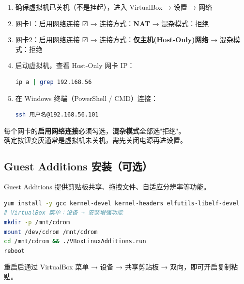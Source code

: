 \documentclass[12pt,a4paper]{ctexart}
\begin{document}
\begin{enumerate}[label=\arabic*.,leftmargin=*]
  \item 确保虚拟机已关机（不是挂起），进入 VirtualBox → 设置 → 网络
  \item 网卡1：启用网络连接 ☑ → 连接方式：\textbf{NAT} → 混杂模式：拒绝
  \item 网卡2：启用网络连接 ☑ → 连接方式：\textbf{仅主机(Host-Only)网络} → 混杂模式：拒绝
  \item 启动虚拟机，查看 Host-Only 网卡 IP：
  \begin{cmdbox}
  \begin{lstlisting}[language=bash,numbers=none]
ip a | grep 192.168.56
  \end{lstlisting}
  \end{cmdbox}
  \item 在 Windows 终端（PowerShell / CMD）连接：
  \begin{cmdbox}
  \begin{lstlisting}[language=bash,numbers=none]
ssh 用户名@192.168.56.101
  \end{lstlisting}
  \end{cmdbox}
\end{enumerate}

\begin{warnbox}
  每个网卡的\textbf{启用网络连接}必须勾选，\textbf{混杂模式}全部选"拒绝"。\\
  确定按钮变灰通常是虚拟机未关机，需先关闭电源再进设置。
\end{warnbox}

\subsection{Guest Additions 安装（可选）}

Guest Additions 提供剪贴板共享、拖拽文件、自适应分辨率等功能。

\begin{cmdbox}
\small
\begin{lstlisting}[language=bash,numbers=none]
yum install -y gcc kernel-devel kernel-headers elfutils-libelf-devel
# VirtualBox 菜单：设备 → 安装增强功能
mkdir -p /mnt/cdrom
mount /dev/cdrom /mnt/cdrom
cd /mnt/cdrom && ./VBoxLinuxAdditions.run
reboot
\end{lstlisting}
\end{cmdbox}

重启后通过 VirtualBox 菜单 → 设备 → 共享剪贴板 → 双向，即可开启复制粘贴。

\newpage
\end{document}
